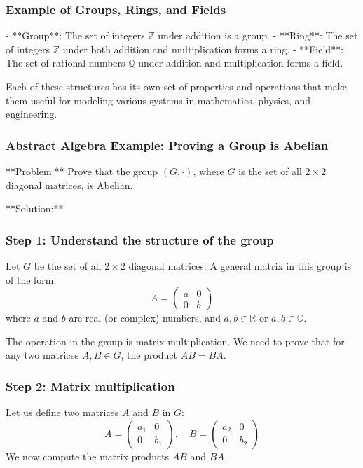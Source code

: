 \documentclass{article}
\begin{document}
\subsubsection*{Example of Groups, Rings, and Fields}

- **Group**: The set of integers \( \mathbb{Z} \) under addition is a group.
- **Ring**: The set of integers \( \mathbb{Z} \) under both addition and multiplication forms a ring.
- **Field**: The set of rational numbers \( \mathbb{Q} \) under addition and multiplication forms a field.

Each of these structures has its own set of properties and operations that make them useful for modeling various systems in mathematics, physics, and engineering.

\subsubsection{Abstract Algebra Example: Proving a Group is Abelian}

**Problem:**
Prove that the group \( (G, \cdot) \), where \( G \) is the set of all \( 2 \times 2 \) diagonal matrices, is Abelian.

**Solution:**

\subsubsection*{Step 1: Understand the structure of the group}

Let \( G \) be the set of all \( 2 \times 2 \) diagonal matrices. A general matrix in this group is of the form:
\[
A = \begin{pmatrix} a & 0 \\ 0 & b \end{pmatrix}
\]
where \( a \) and \( b \) are real (or complex) numbers, and \( a, b \in \mathbb{R} \) or \( a, b \in \mathbb{C} \).

The operation in the group is matrix multiplication. We need to prove that for any two matrices \( A, B \in G \), the product \( AB = BA \).

\subsubsection*{Step 2: Matrix multiplication}

Let us define two matrices \( A \) and \( B \) in \( G \):
\[
A = \begin{pmatrix} a_1 & 0 \\ 0 & b_1 \end{pmatrix}, \quad B = \begin{pmatrix} a_2 & 0 \\ 0 & b_2 \end{pmatrix}
\]
We now compute the matrix products \( AB \) and \( BA \).
\end{document}
